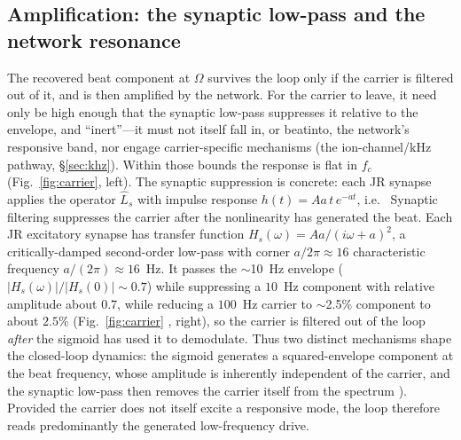 \documentclass[11pt,a4paper]{article}
\providecommand{\DIFaddtex}[1]{{\protect\color{blue} \sf #1}} %
\providecommand{\DIFdeltex}[1]{{\protect\color{red} \scriptsize #1}} %
\providecommand{\DIFaddbegin}{} %
\providecommand{\DIFaddend}{} %
\providecommand{\DIFdelbegin}{} %
\providecommand{\DIFdelend}{} %
\providecommand{\DIFadd}[1]{\texorpdfstring{\DIFaddtex{#1}}{#1}} %
\providecommand{\DIFdel}[1]{\texorpdfstring{\DIFdeltex{#1}}{}} %
\begin{document}
\subsection{Amplification: the synaptic low-pass and the network resonance}\label{sec:carrier}
\DIFdelbegin \DIFdel{The recovered beat component at $\Omega$ survives the loop only if the carrier is filtered
out of it, and is then amplified by the network. For the carrier to leave, it need only be
high enough that the synaptic low-pass suppresses it relative to the envelope, and
``inert''---it must not itself fall in, or beatinto, the network's responsive band, nor
engage carrier-specific mechanisms (the ion-channel/kHz pathway, \S\ref{sec:khz}). Within
those bounds the response is flat in $f_c$ (Fig.~\ref{fig:carrier}, left). The synaptic
suppression is concrete: each JR synapse applies the operator $\hat L_s$ with impulse response $h(t)=Aa\,t\,e^{-at}$,
i.e.\ }\DIFdelend \DIFaddbegin \DIFadd{Synaptic filtering suppresses the carrier after the nonlinearity has generated
the beat. Each JR excitatory synapse has }\DIFaddend transfer function
$H_s(\omega)=Aa/(i\omega+a)^2$, a \DIFdelbegin \DIFdel{critically-damped }\DIFdelend second-order low-pass with \DIFdelbegin \DIFdel{corner $a/2\pi\approx16$}\DIFdelend \DIFaddbegin \DIFadd{characteristic
frequency $a/(2\pi)\approx16$}\DIFaddend ~Hz. It passes \DIFdelbegin \DIFdel{the $\sim$10~Hz envelope
($|H_s(\omega)|/|H_s(0)|\!\sim\!0.7$) while suppressing }\DIFdelend a \DIFaddbegin \DIFadd{$10$~Hz component with relative
amplitude about $0.7$, while reducing a }\DIFaddend $100$~Hz \DIFdelbegin \DIFdel{carrier to $\sim$2.5\%
}\DIFdelend \DIFaddbegin \DIFadd{component to about $2.5\%$
}\DIFaddend (Fig.~\ref{fig:carrier}\DIFdelbegin \DIFdel{, right), so the carrier is filtered out of the loop
\emph{after} the sigmoid has used it to demodulate. Thus two distinct mechanisms shape the closed-loop dynamics: the sigmoid generates a squared-envelope component at the beat frequency, whose amplitude is inherently independent of the carrier, and the synaptic low-pass then removes the carrier itself from the spectrum}\DIFdelend \DIFaddbegin \DIFadd{)}\DIFaddend . \DIFaddbegin \DIFadd{Provided the carrier does not itself excite a responsive
mode, the loop therefore reads predominantly the generated low-frequency drive.
}\DIFaddend


\end{document}
